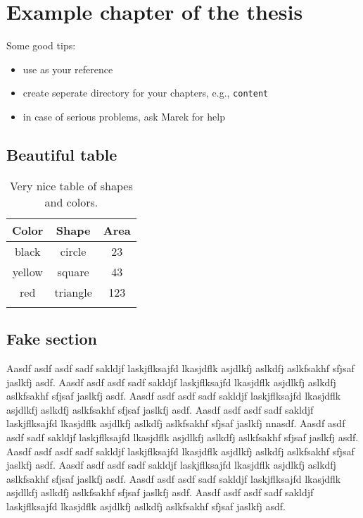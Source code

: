 
\chapter{Example chapter of the thesis}
\label{cha:example-chapt-thes}

Some good tips:

\begin{itemize}
\item use \cite{Oetiket2008Short} as your reference
\item create seperate directory for your chapters, e.g.,
  \texttt{content}
\item in case of serious problems, ask Marek for help
\end{itemize}



\section{Beautiful table}
\label{sec:beautiful-table}

\begin{table}[htbp]
  \centering
  \begin{tabular}{c c c}
    \hline{}
    \textbf{Color} & \textbf{Shape} & \textbf{Area} \\
    \hline{}
    black & circle & 23 \\
    yellow & square & 43 \\
    red & triangle & 123 \\
    \hline{}
  \end{tabular}
  \caption{Very nice table of shapes and colors.}
  \label{tab:cute}
\end{table}



\section{Fake section}
\label{sec:fake-section}

Aasdf asdf asdf sadf sakldjf laskjflksajfd lkasjdflk asjdlkfj aslkdfj
aslkfsakhf sfjsaf jaslkfj asdf.  Aasdf asdf asdf sadf sakldjf
laskjflksajfd lkasjdflk asjdlkfj aslkdfj aslkfsakhf sfjsaf jaslkfj
asdf.  Aasdf asdf asdf sadf sakldjf laskjflksajfd lkasjdflk asjdlkfj
aslkdfj aslkfsakhf sfjsaf jaslkfj asdf.  Aasdf asdf asdf sadf sakldjf
laskjflksajfd lkasjdflk asjdlkfj aslkdfj aslkfsakhf sfjsaf jaslkfj
nnasdf.  Aasdf asdf asdf sadf sakldjf laskjflksajfd lkasjdflk asjdlkfj
aslkdfj aslkfsakhf sfjsaf jaslkfj asdf.  Aasdf asdf asdf sadf sakldjf
laskjflksajfd lkasjdflk asjdlkfj aslkdfj aslkfsakhf sfjsaf jaslkfj
asdf.  Aasdf asdf asdf sadf sakldjf laskjflksajfd lkasjdflk asjdlkfj
aslkdfj aslkfsakhf sfjsaf jaslkfj asdf.  Aasdf asdf asdf sadf sakldjf
laskjflksajfd lkasjdflk asjdlkfj aslkdfj aslkfsakhf sfjsaf jaslkfj
asdf.  Aasdf asdf asdf sadf sakldjf laskjflksajfd lkasjdflk asjdlkfj
aslkdfj aslkfsakhf sfjsaf jaslkfj asdf.



